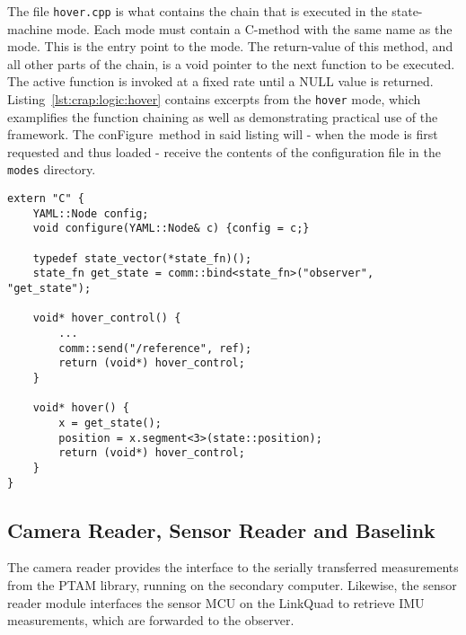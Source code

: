 \begin{minipage}{\textwidth}
\end{minipage}

        The file \texttt{hover.cpp} is what contains the chain that is executed
        in the state-machine mode. Each mode must contain a C-method with the
        same name as the mode. This is the entry point to the mode.
        The return-value of this method, and all other parts of the chain,
        is a void pointer to the next function to be executed.
        The active function is invoked at a fixed rate until a NULL value is
        returned. Listing~\ref{lst:crap:logic:hover} contains
        excerpts from the \texttt{hover} mode, which examplifies the function
        chaining as well as demonstrating practical use of the \crap framework.
        The conFigure~method in said listing will - when the mode is first
        requested and thus loaded - receive the contents of the configuration
        file in the \texttt{modes} directory.
        \begin{minipage}{\textwidth}
        \begin{lstlisting}
extern "C" {
    YAML::Node config;
    void configure(YAML::Node& c) {config = c;}

    typedef state_vector(*state_fn)();
    state_fn get_state = comm::bind<state_fn>("observer", "get_state");

    void* hover_control() {
        ...
        comm::send("/reference", ref);
        return (void*) hover_control;
    }

    void* hover() {
        x = get_state();
        position = x.segment<3>(state::position);
        return (void*) hover_control;
    }
}
        \end{lstlisting}
        \end{minipage}

        \subsection{Camera Reader, Sensor Reader and Baselink}
            The camera reader provides the interface to the serially transferred
            measurements from the PTAM library, running on the secondary computer.
            Likewise, the sensor reader module interfaces the sensor MCU on the LinkQuad
            to retrieve IMU measurements, which are forwarded to the observer.

